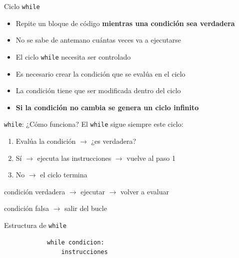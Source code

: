 \documentclass{beamer}
\begin{document}
    \begin{frame}{Ciclo \texttt{while}}
        \begin{itemize}
            \item Repite un bloque de código \textbf{mientras una condición sea verdadera}
            \item No se sabe de antemano cuántas veces va a ejecutarse
            \item El ciclo \texttt{while} necesita ser controlado
            \item Es necesario crear la condición que se evalúa en el ciclo
            \item La condición tiene que ser modificada dentro del ciclo
            \item \textbf{Si la condición no cambia se genera un ciclo infinito}
        \end{itemize}
    \end{frame}

    \begin{frame}{\texttt{while}: ¿Cómo funciona?}
        El \texttt{while} sigue siempre este ciclo:
        \begin{enumerate}
            \item Evalúa la condición $\rightarrow$ ¿es verdadera?
            \item Sí $\rightarrow$ ejecuta las instrucciones $\rightarrow$ vuelve al paso 1
            \item No $\rightarrow$ el ciclo termina
        \end{enumerate}
        condición verdadera $\rightarrow$ ejecutar $\rightarrow$ volver a evaluar

        condición falsa     $\rightarrow$ salir del bucle
    \end{frame}

    \begin{frame}[fragile,t]{Estructura de \texttt{while}}
        \begin{verbatim}
            while condicion:
                instrucciones
        \end{verbatim}
    \end{frame}
\end{document}
